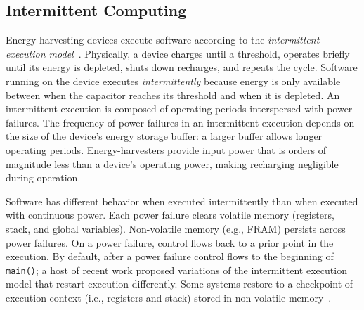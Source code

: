 \subsection{Intermittent Computing}
\label{sec:background_consistency}

Energy-harvesting devices execute software according to the {\em intermittent execution model}~\cite{dino,chain,alpaca,ratchet}. Physically, a device charges until a threshold, operates briefly until its energy is depleted, shuts down recharges, and repeats the cycle. Software running on the device executes {\em intermittently} because energy is only available between when the capacitor reaches its threshold and when it is depleted. An intermittent execution is composed of operating periods interspersed with power failures. The frequency of power failures in an intermittent execution depends on the size of the device's energy storage buffer: a larger buffer allows longer operating periods. Energy-harvesters provide input power that is orders of magnitude less than a device's operating power, making recharging negligible during operation.

Software has different behavior when executed intermittently than when executed with continuous power.  Each power failure clears volatile memory (registers, stack, and global variables). Non-volatile memory (e.g., FRAM) persists across power failures. On a power failure, control flows back to a prior point in the execution. By default, after a power failure control flows to the beginning of {\tt main()}; a host of recent work proposed variations of the intermittent execution model that restart execution differently. Some systems restore to a checkpoint of execution context (i.e., registers and stack) stored in non-volatile memory~\cite{mementos,hibernusplusplus,quickrecall,idetic}.


